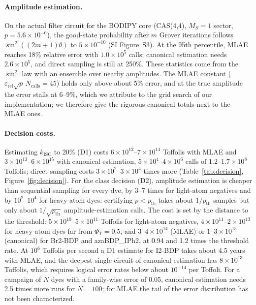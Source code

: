 \documentclass[journal=jctcce,manuscript=article,layout=twocolumn]{achemso}
\newcommand{\kisc}{k_\mathrm{ISC}}
\begin{document}
\paragraph{Amplitude estimation.} On the actual filter circuit for the BODIPY core (CAS(4,4), $M_S=1$ sector,
$p=5.6\times10^{-6}$), the good-state probability after $m$ Grover iterations follows
$\sin^2((2m+1)\theta)$ to $5\times10^{-10}$ (SI Figure~S3). At the 95th percentile, MLAE reaches 18\% relative
error with $1.0\times10^{5}$ calls; canonical estimation needs $2.6\times10^{5}$, and direct sampling is still at
250\%. These statistics come from the $\sin^2$ law with an ensemble over nearby amplitudes. The MLAE constant
($\varepsilon_\mathrm{rel}\sqrt p\,N_\mathrm{calls}=45$) holds only above about 5\% error, and at the true
amplitude the error stalls at 6--9\%, which we attribute to the grid search of our implementation; we therefore
give the rigorous canonical totals next to the MLAE ones.

\paragraph{Decision costs.} Estimating $\kisc$ to 20\% (D1) costs $6\times10^{12}$--$7\times10^{14}$ Toffolis
with MLAE and $3\times10^{13}$--$6\times10^{15}$ with canonical estimation, $5\times10^{4}$--$4\times10^{6}$ calls
of $1.2$--$1.7\times10^{8}$ Toffolis; direct sampling costs $3\times10^{2}$--$3\times10^{4}$ times more
(Table~\ref{tab:decision}, Figure~\ref{fig:decision}). For the class decision (D2), amplitude estimation is
cheaper than sequential sampling for every dye, by 3--7 times for light-atom negatives and by $10^{2}$--$10^{4}$
for heavy-atom dyes: certifying $p<p_\mathrm{th}$ takes about $1/p_\mathrm{th}$ samples but only about
$1/\sqrt{p_\mathrm{th}}$ amplitude-estimation calls. The cost is set by the distance to the threshold:
$5\times10^{10}$--$5\times10^{11}$ Toffolis for light-atom negatives, $4\times10^{11}$--$2\times10^{13}$ for
heavy-atom dyes far from $\Phi_T=0.5$, and $3$--$4\times10^{14}$ (MLAE) or $1$--$3\times10^{15}$ (canonical)
for Br2-BDP and azaBDP\_IPh2, at 0.94 and 1.2 times the threshold rate. At $10^{6}$ Toffolis per second a D1
estimate for I2-BDP takes about 4.5 years with MLAE, and the deepest single circuit of canonical estimation
has $8\times10^{13}$ Toffolis, which requires logical error rates below about $10^{-14}$ per Toffoli. For a
campaign of $N$ dyes with a family-wise error of 0.05, canonical estimation needs 2.5 times more runs for
$N=100$; for MLAE the tail of the error distribution has not been characterized.
\end{document}

